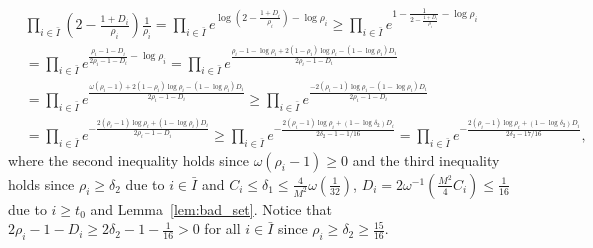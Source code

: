 \documentclass[11pt,letterpaper]{article}
\newcommand\0{{\Vector{0}}}
\newcommand\1{{\Vector{1}}}
\numberwithin{assumption}{section}
\numberwithin{definition}{section}
\numberwithin{theorem}{section}
\numberwithin{remark}{section}
\begin{document}
    \begin{equation}\label{proposition_4_7}
    \begin{split}
        & \prod_{i \in \bar{I}}(2 - \frac{1 + D_i}{\rho_i})\frac{1}{\rho_i} = \prod_{i \in \bar{I}}e^{\log{(2 - \frac{1 + D_i}{\rho_i})} - \log{\rho_i}} \geq \prod_{i \in \bar{I}}e^{1 - \frac{1}{2 - \frac{1 + D_i}{\rho_i}} - \log{\rho_i}} \\
        & = \prod_{i \in \bar{I}}e^{\frac{\rho_i - 1 - D_i}{2\rho_i - 1 - D_i} - \log{\rho_i}} = \prod_{i \in \bar{I}}e^{\frac{\rho_i - 1 - \log{\rho_i} + 2(1 - \rho_i)\log{\rho_i} - (1 - \log{\rho_i})D_i}{2\rho_i - 1 - D_i}} \\
        & = \prod_{i \in \bar{I}}e^{\frac{\omega(\rho_i - 1) + 2(1 - \rho_i)\log{\rho_i} - (1 - \log{\rho_i})D_i }{2\rho_i - 1 - D_i}} \geq \prod_{i \in \bar{I}}e^{\frac{- 2(\rho_i - 1)\log{\rho_i} - (1 - \log{\rho_i})D_i }{2\rho_i - 1 - D_i}} \\
        & = \prod_{i \in \bar{I}}e^{-\frac{2(\rho_i - 1)\log{\rho_i} + (1 - \log{\rho_i})D_i}{2\rho_i - 1 - D_i}} \geq \prod_{i \in \bar{I}}e^{-\frac{2(\rho_i - 1)\log{\rho_i} + (1 - \log{\delta_2})D_i}{2\delta_2 - 1 - {1}/{16}}} = \prod_{i \in \bar{I}}e^{-\frac{2(\rho_i - 1)\log{\rho_i} + (1 - \log{\delta_2})D_i}{2\delta_2 - {17}/{16}}} ,
    \end{split}
    \end{equation}
    where the second inequality holds since $\omega(\rho_i - 1) \geq 0$ and the third inequality holds since $\rho_i \geq \delta_2$ due to $i \in \bar{I}$ and $C_i \leq \delta_1 \leq \frac{4}{M^2}\omega(\frac{1}{32})$, $D_i = 2\omega^{-1}(\frac{M^2}{4}C_i) \leq \frac{1}{16}$ due to $i \geq t_0$ and Lemma~\ref{lem:bad_set}. Notice that $2\rho_i - 1 - D_i \geq 2\delta_2 - 1 - \frac{1}{16} > 0$ for all $i \in \bar{I}$ since $\rho_i \geq \delta_2 \geq \frac{15}{16}$.
\end{document}
